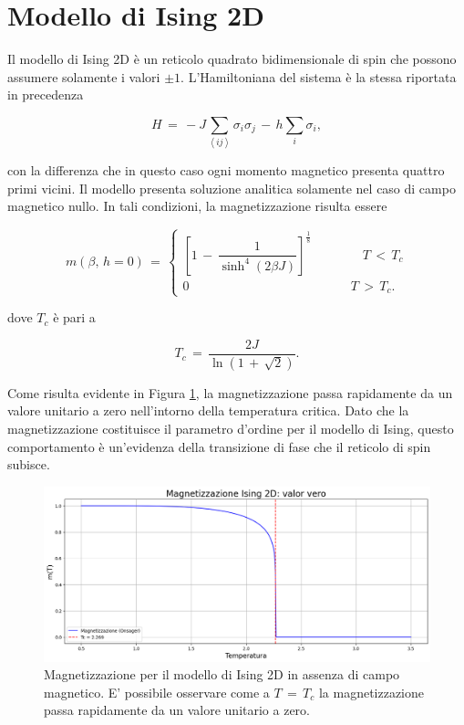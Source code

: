\section{Modello di Ising 2D}

Il modello di Ising 2D è un reticolo quadrato bidimensionale di spin che possono assumere solamente i valori $\pm 1$. L'Hamiltoniana 
del sistema è la stessa riportata in precedenza

\begin{equation}
    H\,=\,-J\sum_{\left<ij\right>} \sigma_i \sigma_j\,-\,h\sum_{i} \sigma_i,
    \label{eq: ising2D_ham}
\end{equation}

con la differenza che in questo caso ogni momento magnetico presenta quattro primi vicini. Il modello presenta soluzione analitica 
solamente nel caso di campo magnetico nullo. In tali condizioni, la magnetizzazione risulta essere 

\begin{equation}
    m\left(\beta,\,h=0\right)\,=\,
    \begin{cases}
    \left[1\,-\,\dfrac{1}{\sinh^4{\left(2\beta J\right)}}\right]^{\frac{1}{8}} \qquad \qquad T\,<\,T_c \\
    0 \qquad \qquad \qquad \qquad \qquad \qquad \,\,\,\, T\,>\,T_c.
    \end{cases}
    \label{eq: magn_Onsager_1944}
\end{equation}

dove $T_c$ è pari a 

\begin{equation}
    T_c\,=\,\frac{2J}{\ln{\left(1\,+\,\sqrt{2}\right)}}.
    \label{eq: tc_Ising2D_Ons}
\end{equation}

Come risulta evidente in Figura \ref{fig: magn_Ising2D}, la magnetizzazione passa rapidamente da un valore unitario a zero nell'intorno 
della temperatura critica. Dato che la magnetizzazione costituisce il parametro d'ordine per il modello di Ising, questo comportamento è
un'evidenza della transizione di fase che il reticolo di spin subisce.

\begin{figure}[H]
    \centering
    \includegraphics[width=\textwidth]{Immagini/magn_Ising2D.png}
    \caption{Magnetizzazione per il modello di Ising 2D in assenza di campo magnetico. E' possibile osservare come a $T\,=\,T_c$ la 
    magnetizzazione passa rapidamente da un valore unitario a zero. }
    \label{fig: magn_Ising2D}
\end{figure}

